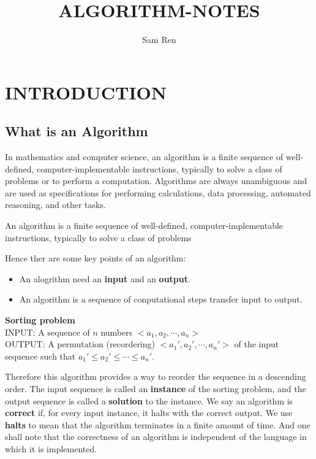 \documentclass{article}
\title{ALGORITHM-NOTES}
\author{Sam Ren}
\theoremstyle{mytheoremstyle}
\theoremstyle{mytheoremstyle}
\theoremstyle{myproblemstyle}
\theoremstyle{myproblemstyle}
\begin{document}
    \maketitle
\section{INTRODUCTION}
\subsection{What is an Algorithm}
In mathematics and computer science, an algorithm is a finite sequence of well-defined, computer-implementable instructions, typically to solve a class of problems or to perform a computation. Algorithms are always unambiguous and are used as specifications for performing calculations, data processing, automated reasoning, and other tasks.
\begin{definition}[Algorithm]
  An algorithm is a finite sequence of well-defined, computer-implementable instructions, typically to solve a class of problems
\end{definition}

Hence ther are some key points of an algorithm:
\begin{itemize}
  \item An alogrithm need an \textbf{input} and an \textbf{output}.
  \item An algorithm is a sequence of conputational steps transfer input to output.
\end{itemize}

\begin{example}
 \textbf{Sorting problem}
 \\
INPUT: A sequence of $n$ numbers $<a_1,a_2,\cdots,a_n>$\\
OUTPUT: A permutation (recordering) $<a_1',a_2',\cdots,a_n'>$ of the input sequence such that $a_1'\leq a_2'\leq \cdots \leq a_n'$.
\end{example}

Therefore this algorithm provides a way to reorder the sequence in a descending order.
The input sequence is called an \textbf{instance} of the sorting problem, and the output sequence is called a \textbf{solution} to the instance.
We say an algorithm is \textbf{correct} if, for every input instance, it halts with the correct output.
We use \textbf{halts} to mean that the algorithm terminates in a finite amount of time.
And one shall note that the correctness of an algorithm is independent of the language in which it is implemented.
\end{document}
